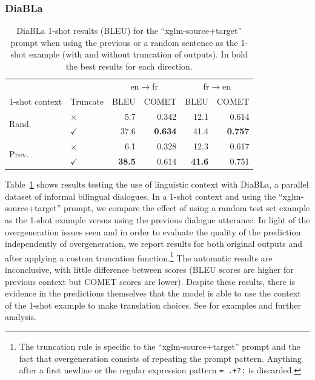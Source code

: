 \documentclass[twoside,11pt]{article}
\begin{document}
\subsubsection{DiaBLa}

\begin{table}[!ht]
    \centering\small
    \begin{tabular}{llrrrr}
    \toprule
    & & \multicolumn{2}{c}{en$\rightarrow$fr} & \multicolumn{2}{c}{fr$\rightarrow$en} \\
    1-shot context & Truncate & BLEU & COMET & BLEU & COMET \\
    \toprule
    \multirow{2}{*}{Rand.}   & $\times$ &  5.7 & 0.342 & 12.1 & 0.614 \\
    &  $\checkmark$ & 37.6 & \textbf{0.634} & 41.4 & \textbf{0.757} \\
    \midrule
    \multirow{2}{*}{Prev.}   & $\times$ & 6.1 & 0.328 & 12.3 & 0.617 \\
    & $\checkmark$ & \textbf{38.5} & 0.614 & \textbf{41.6} & 0.751 \\
    \bottomrule
    \end{tabular}
    \caption{DiaBLa 1-shot results (BLEU) for the ``xglm-source+target'' prompt when using the previous or a random sentence as the 1-shot example (with and without truncation of outputs). In bold the best results for each direction.}
    \label{tab:diabla-context-results}
\end{table}

Table~\ref{tab:diabla-context-results} shows results testing the use of linguistic context with DiaBLa, a parallel dataset of informal bilingual dialogues. In a 1-shot context and using the ``xglm-source+target'' prompt, we compare the effect of using a random test set example as the 1-shot example versus using the previous dialogue utterance. In light of the overgeneration issues seen and in order to evaluate the quality of the prediction independently of overgeneration, we report results for both original outputs and after applying a custom truncation function.\footnote{The truncation rule is specific to the ``xglm-source+target'' prompt and the fact that overgeneration consists of repeating the prompt pattern. Anything after a first newline or the regular expression pattern \texttt{= .+?:} is discarded.} The automatic results are inconclusive, with little difference between scores (BLEU scores are higher for previous context but COMET scores are lower). Despite these results, there is evidence in the predictions themselves that the model is able to use the context of the 1-shot example to make translation choices. See \citep{bawden-yvon-2023-mt-bloom} for examples and further analysis.
\end{document}
